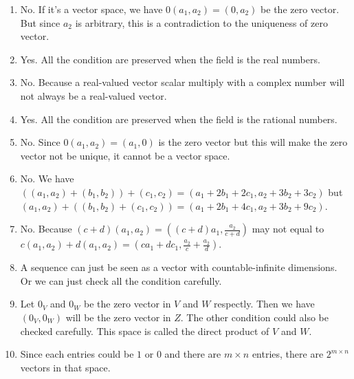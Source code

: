 \begin{enumerate}
\item No. If it's a vector space, we have $0(a_1,a_2)=(0,a_2)$ be the zero vector. But since $a_2$ is arbitrary, this is a contradiction to the uniqueness of zero vector.
\item Yes. All the condition are preserved when the field is the real numbers.
\item No. Because a real-valued vector scalar multiply with a complex number will not always be a real-valued vector.
\item Yes. All the condition are preserved when the field is the rational numbers.
\item No. Since $0(a_1,a_2)=(a_1,0)$ is the zero vector but this will make the zero vector not be unique, it cannot be a vector space.
\item No. We have $((a_1,a_2)+(b_1,b_2))+(c_1,c_2)=(a_1+2b_1+2c_1,a_2+3b_2+3c_2)$ but $(a_1,a_2)+((b_1,b_2)+(c_1,c_2))=(a_1+2b_1+4c_1,a_2+3b_2+9c_2)$.
\item No. Because $(c+d)(a_1,a_2)=((c+d)a_1,\frac{a_2}{c+d})$ may not equal to $c(a_1,a_2)+d(a_1,a_2)=(ca_1+dc_1,\frac{a_2}{c}+\frac{a_2}{d})$.
\item A sequence can just be seen as a vector with countable-infinite dimensions. Or we can just check all the condition carefully.
\item Let $0_V$ and $0_W$ be the zero vector in $V$ and $W$ respectly. Then we have $(0_V,0_W)$ will be the zero vector in $Z$. The other condition could also be checked carefully. This space is called the direct product of $V$ and $W$.
\item Since each entries could be $1$ or $0$ and there are $m\times n$ entries, there are $2^{m\times n}$ vectors in that space.
\end{enumerate}
